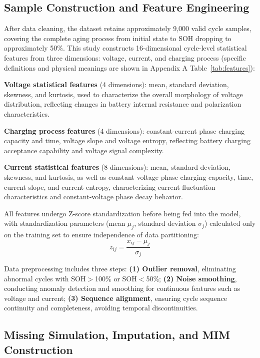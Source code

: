 \documentclass[10pt,a4paper]{article}
\begin{document}
\subsection{Sample Construction and Feature Engineering}

After data cleaning, the dataset retains approximately 9,000 valid cycle samples, covering the complete aging process from initial state to SOH dropping to approximately 50\%. This study constructs 16-dimensional cycle-level statistical features from three dimensions: voltage, current, and charging process (specific definitions and physical meanings are shown in Appendix A Table~\ref{tab:features}):

\textbf{Voltage statistical features} (4 dimensions): mean, standard deviation, skewness, and kurtosis, used to characterize the overall morphology of voltage distribution, reflecting changes in battery internal resistance and polarization characteristics.

\textbf{Charging process features} (4 dimensions): constant-current phase charging capacity and time, voltage slope and voltage entropy, reflecting battery charging acceptance capability and voltage signal complexity.

\textbf{Current statistical features} (8 dimensions): mean, standard deviation, skewness, and kurtosis, as well as constant-voltage phase charging capacity, time, current slope, and current entropy, characterizing current fluctuation characteristics and constant-voltage phase decay behavior.

All features undergo Z-score standardization before being fed into the model, with standardization parameters (mean $\mu_j$, standard deviation $\sigma_j$) calculated only on the training set to ensure independence of data partitioning:
\begin{equation}
    z_{ij} = \frac{x_{ij} - \mu_j}{\sigma_j}
\end{equation}

Data preprocessing includes three steps: \textbf{(1) Outlier removal}, eliminating abnormal cycles with SOH$>$100\% or SOH$<$50\%; \textbf{(2) Noise smoothing}, conducting anomaly detection and smoothing for continuous features such as voltage and current; \textbf{(3) Sequence alignment}, ensuring cycle sequence continuity and completeness, avoiding temporal discontinuities.

\subsection{Missing Simulation, Imputation, and MIM Construction}
\end{document}
